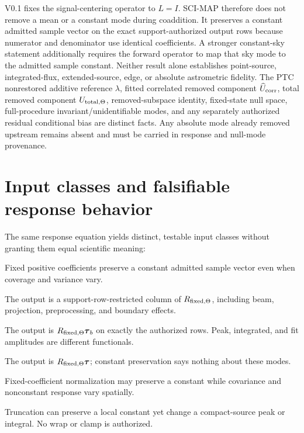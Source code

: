 \documentclass[10pt]{article}
\begin{document}
V0.1 fixes the signal-centering operator to \(L=I\). SCI-MAP therefore does not
remove a mean or a constant mode during coaddition. It preserves a constant
admitted sample vector on the exact support-authorized output rows because
numerator and denominator use identical coefficients. A stronger constant-sky
statement additionally requires the forward operator to map that sky mode to
the admitted sample constant. Neither result alone establishes point-source,
integrated-flux, extended-source, edge, or absolute astrometric fidelity. The
PTC nonrestored additive reference \(\lambda\), fitted correlated removed
component \(\widehat U_{\rm corr}\), total removed component
\(U_{{\rm total},\Theta}\), removed-subspace identity, fixed-state null space,
full-procedure invariant/unidentifiable modes, and any separately authorized
residual conditional bias are distinct facts. Any absolute mode already
removed upstream remains absent and must be carried in response and null-mode
provenance.

\clearpage
\section{Input classes and falsifiable response behavior}

The same response equation yields distinct, testable input classes without
granting them equal scientific meaning:

\begin{description}[style=nextline,leftmargin=1.8em]
\item[Constant.] Fixed positive coefficients preserve a constant admitted
sample vector even when coverage and variance vary.
\item[Delta or basis pixel.] The output is a support-row-restricted column of
\(R_{{\rm fixed},\Theta}\), including beam, projection, preprocessing, and boundary
effects.
\item[Point-source template.] The output is
\(R_{{\rm fixed},\Theta}\boldsymbol\tau_b\) on exactly the authorized rows. Peak,
integrated, and fit amplitudes are different functionals.
\item[Resolved, gradient, and Fourier structure.] The output is
\(R_{{\rm fixed},\Theta}\boldsymbol\tau\); constant preservation says nothing about these
modes.
\item[Variable coverage.] Fixed-coefficient normalization may preserve a
constant while covariance and nonconstant response vary spatially.
\item[Finite boundary.] Truncation can preserve a local constant yet change a
compact-source peak or integral. No wrap or clamp is authorized.
\end{description}
\end{document}
